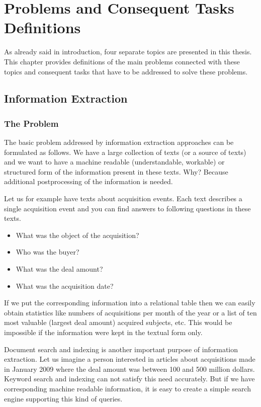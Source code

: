 \chapter{Problems and Consequent Tasks Definitions} \label{sec:ch_problems}

As already said in introduction, four separate topics are presented in this thesis. This chapter provides definitions of the main problems connected with these topics and consequent tasks that have to be addressed to solve these problems.

\section{Information Extraction}

\subsection{The Problem}

The basic problem addressed by information extraction approaches can be formulated as follows. We have a large collection of texts (or a source of texts) and we want to have a machine readable (understandable, workable) or structured form of the information present in these texts. Why? Because additional postprocessing of the information is needed.

Let us for example have texts about acquisition events. Each text describes a single acquisition event and you can find answers to following questions in these texts. 
\begin{itemize}
	\item What was the object of the acquisition? 
	\item Who was the buyer? 
	\item What was the deal amount?
	\item What was the acquisition date?
\end{itemize}


If we put the corresponding information into a relational table then we can easily obtain statistics like numbers of acquisitions per month of the year or a list of ten most valuable (largest deal amount) acquired subjects, etc. This would be impossible if the information were kept in the textual form only.

Document search and indexing is another important purpose of information extraction. Let us imagine a person interested in articles about acquisitions made in January 2009 where the deal amount was between 100 and 500 million dollars.  Keyword search and indexing can not satisfy this need accurately. But if we have corresponding machine readable information, it is easy to create a simple search engine supporting this kind of queries.

